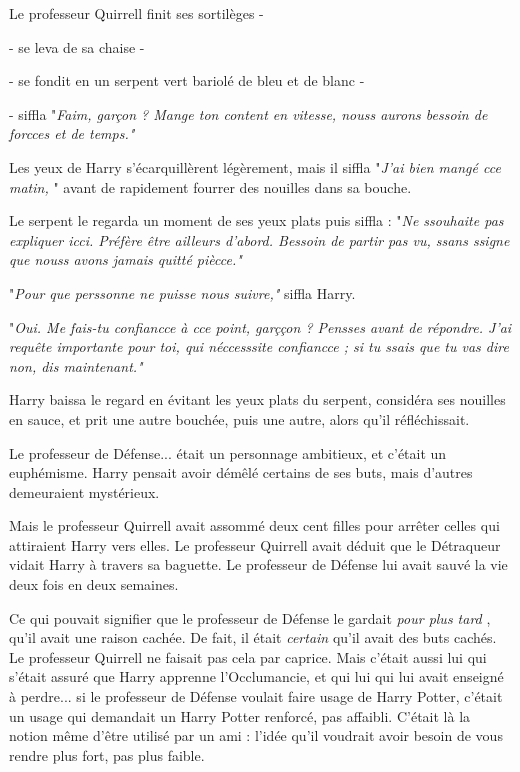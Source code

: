 Le professeur Quirrell finit ses sortilèges -

- se leva de sa chaise -

- se fondit en un serpent vert bariolé de bleu et de blanc -

- siffla "\emph{Faim, garçon ? Mange ton content en vitesse, nouss aurons bessoin de forcces et de temps."} 

Les yeux de Harry s'écarquillèrent légèrement, mais il siffla "\emph{J'ai bien mangé cce matin,} " avant de rapidement fourrer des nouilles dans sa bouche.

Le serpent le regarda un moment de ses yeux plats puis siffla : "\emph{Ne ssouhaite pas expliquer icci. Préfère être ailleurs d'abord. Bessoin de partir pas vu, ssans ssigne que nouss avons jamais quitté piècce."} 

"\emph{Pour que perssonne ne puisse nous suivre," } siffla Harry.

"\emph{Oui. Me fais-tu confiancce à cce point, garççon ? Pensses avant de répondre. J'ai requête importante pour toi, qui néccesssite confiancce ; si tu ssais que tu vas dire non, dis maintenant."} 

Harry baissa le regard en évitant les yeux plats du serpent, considéra ses nouilles en sauce, et prit une autre bouchée, puis une autre, alors qu'il réfléchissait.

Le professeur de Défense... était un personnage ambitieux, et c'était un euphémisme. Harry pensait avoir démêlé certains de ses buts, mais d'autres demeuraient mystérieux.

Mais le professeur Quirrell avait assommé deux cent filles pour arrêter celles qui attiraient Harry vers elles. Le professeur Quirrell avait déduit que le Détraqueur vidait Harry à travers sa baguette. Le professeur de Défense lui avait sauvé la vie deux fois en deux semaines.

Ce qui pouvait signifier que le professeur de Défense le gardait \emph{pour plus tard} , qu'il avait une raison cachée. De fait, il était \emph{certain}  qu'il avait des buts cachés. Le professeur Quirrell ne faisait pas cela par caprice. Mais c'était aussi lui qui s'était assuré que Harry apprenne l'Occlumancie, et qui lui qui lui avait enseigné à perdre... si le professeur de Défense voulait faire usage de Harry Potter, c'était un usage qui demandait un Harry Potter renforcé, pas affaibli. C'était là la notion même d'être utilisé par un ami : l'idée qu'il voudrait avoir besoin de vous rendre plus fort, pas plus faible.

